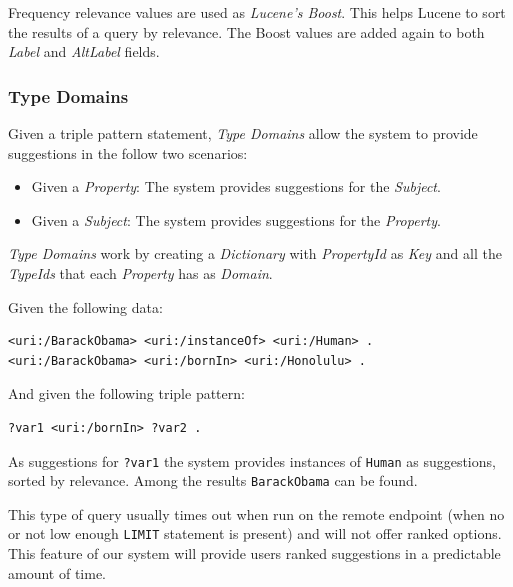 Frequency relevance values are used as \textit{Lucene's Boost}. This helps Lucene to sort the results of a query by relevance. The Boost values are added again to both \textit{Label} and \textit{AltLabel} fields.

\subsubsection{Type Domains}

Given a triple pattern statement, \textit{Type Domains} allow the system to provide suggestions in the follow two scenarios:
\begin{itemize}
    \item Given a \textit{Property}: The system provides suggestions for the \textit{Subject}.
    \item Given a \textit{Subject}: The system provides suggestions for the \textit{Property}.
\end{itemize}

\textit{Type Domains} work by creating a \textit{Dictionary} with \textit{PropertyId} as \textit{Key} and all the \textit{TypeIds} that each \textit{Property} has as \textit{Domain}.

\begin{example}
Given the following data:
\begin{verbatim}
<uri:/BarackObama> <uri:/instanceOf> <uri:/Human> .
<uri:/BarackObama> <uri:/bornIn> <uri:/Honolulu> .
\end{verbatim}

And given the following triple pattern:
\begin{verbatim}
?var1 <uri:/bornIn> ?var2 .
\end{verbatim}

As suggestions for \texttt{?var1} the system provides instances of \texttt{Human} as suggestions, sorted by relevance. Among the results \texttt{BarackObama} can be found.

This type of query usually times out when run on the remote endpoint (when no or not low enough \texttt{LIMIT} statement is present) and will not offer ranked options. This feature of our system will provide users ranked suggestions in a predictable amount of time.
\end{example}

